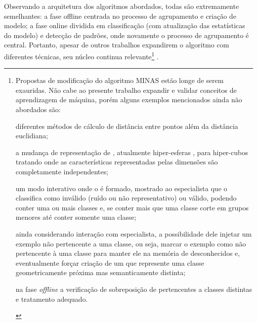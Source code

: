 Observando a arquitetura dos algoritmos abordados, todas são extremamente semelhantes:
a fase offline centrada no processo de agrupamento e criação de modelo;
a fase online dividida em classificação (com atualização das estatísticas do modelo)
e detecção de padrões, onde novamente o processo de agrupamento é central.
Portanto, apesar de outros trabalhos expandirem o algoritmo com diferentes técnicas, seu
núcleo continua relevante\footnote{
Propostas de modificação do algoritmo MINAS estão longe de serem exauridas.
Não cabe ao presente trabalho expandir e validar conceitos de aprendizagem de máquina,
porém alguns exemplos mencionados ainda não abordados são:
\begin{enumerate*}[label={\alph*)}]
    
    \item diferentes métodos de cálculo de distância entre pontos além da
    distância euclidiana;
    
    \item a mudança de representação de \clusters, atualmente hiper-esferas
    \cite{Costa2019thesis}, para hiper-cubos tratando \datasets onde as
    características representadas pelas dimensões são completamente
    independentes;
    
    \item um modo interativo onde o \cluster é formado, mostrado ao especialista
    que o classifica como inválido (ruído ou não representativo) ou válido,
    podendo conter uma ou mais classes e, se conter mais que uma classe corte em
    grupos menores até conter somente uma classe;
    
    \item ainda considerando interação com especialista, a possibilidade dele
    injetar um exemplo não pertencente a uma classe, ou seja, marcar o exemplo
    como não pertencente à uma classe para manter ele na memória de
    desconhecidos e, eventualmente forçar criação de um \cluster que represente
    uma classe geometricamente próxima mas semanticamente distinta;
    
    \item na fase \emph{offline} a verificação de sobreposição de \clusters
    pertencentes a classes distintas e tratamento adequado.

\end{enumerate*}
} \cite{DaSilva2018,DaSilva2018thesis,Costa2019}.




